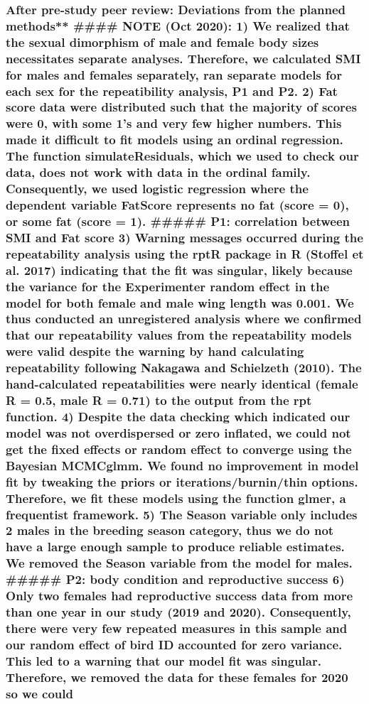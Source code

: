 \documentclass[
]{article}
\begin{document}
{\subsubsection{After pre-study peer review: Deviations from the planned
methods** \#\#\#\# NOTE (Oct 2020): 1) We realized that the sexual
dimorphism of male and female body sizes necessitates separate analyses.
Therefore, we calculated SMI for males and females separately, ran
separate models for each sex for the repeatibility analysis, P1 and P2.
2) Fat score data were distributed such that the majority of scores were
0, with some 1's and very few higher numbers. This made it difficult to
fit models using an ordinal regression. The function simulateResiduals,
which we used to check our data, does not work with data in the ordinal
family. Consequently, we used logistic regression where the dependent
variable FatScore represents no fat (score = 0), or some fat (score =
1). \#\#\#\#\# P1: correlation between SMI and Fat score 3) Warning
messages occurred during the repeatability analysis using the rptR
package in R (Stoffel et al. 2017) indicating that the fit was singular,
likely because the variance for the Experimenter random effect in the
model for both female and male wing length was 0.001. We thus conducted
an unregistered analysis where we confirmed that our repeatability
values from the repeatability models were valid despite the warning by
hand calculating repeatability following Nakagawa and Schielzeth (2010).
The hand-calculated repeatabilities were nearly identical (female R =
0.5, male R = 0.71) to the output from the rpt function. 4) Despite the
data checking which indicated our model was not overdispersed or zero
inflated, we could not get the fixed effects or random effect to
converge using the Bayesian MCMCglmm. We found no improvement in model
fit by tweaking the priors or iterations/burnin/thin options. Therefore,
we fit these models using the function glmer, a frequentist framework.
5) The Season variable only includes 2 males in the breeding season
category, thus we do not have a large enough sample to produce reliable
estimates. We removed the Season variable from the model for males.
\#\#\#\#\# P2: body condition and reproductive success 6) Only two
females had reproductive success data from more than one year in our
study (2019 and 2020). Consequently, there were very few repeated
measures in this sample and our random effect of bird ID accounted for
zero variance. This led to a warning that our model fit was singular.
Therefore, we removed the data for these females for 2020 so we could
}}
\end{document}
